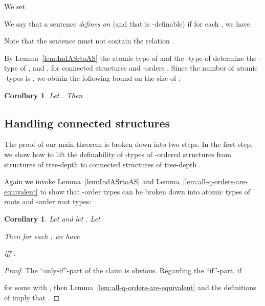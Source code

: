 \documentclass[11pt]{article}
\newtheorem{corollary}[theorem]{Corollary}
\begin{document}
We set

We say that a sentence  \emph{defines
   on } (and that  is -definable)
if for each , we have

Note that the sentence  must not contain the relation
.

By Lemma~\ref{lem:IndASrtoAS} the atomic type of  and the
-type of  determine the -type of , and
, 
for connected structures  and -orders . Since the
number of atomic -types is , we obtain the following bound on the size of
:

\begin{corollary}
  \label{cor:num-connected-types}
  Let . Then 
\end{corollary}

\subsection{Handling connected structures}

The proof of our main theorem is broken down into two steps. In the first step,
we show how to lift the definability of -types of -ordered structures from
structures of tree-depth  to connected structures of tree-depth .

Again we invoke Lemma~\ref{lem:IndASrtoAS} and
Lemma~\ref{lem:all-q-orders-are-equivalent} to show that -order types can be
broken down into atomic types of roots and -order root types:

\begin{corollary}
  \label{cor:rtp-to-tp}
  Let  and let .  Let
  
  Then for each , we have
  
  iff
  .
\end{corollary}
\begin{proof}
  The ``only-if''-part of the claim is obvious.  Regarding the
  ``if''-part, if 
  
  for some  with ,
  then Lemma~\ref{lem:all-q-orders-are-equivalent} and the definitions
  of  imply that
  .
\end{proof}
\end{document}
